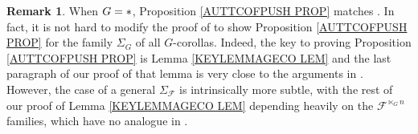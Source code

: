 \documentclass[a4paper,10pt
,draft
]{article}%
\numberwithin{equation}{section}
\numberwithin{figure}{section}
\theoremstyle{definition} %
\newtheorem{remark}[equation]{Remark}%
\newcommand{\1}{\ensuremath{\mathbbm 1}}%
\begin{document}
\begin{remark}\label{WRONGSTRAT REM}
When $G=\**$, Proposition \ref{AUTTCOFPUSH PROP}
matches \cite[Lemma 5.9]{BM08}.
In fact, it is not hard to modify the proof of \cite[Lemma 5.9]{BM08} to show Proposition \ref{AUTTCOFPUSH PROP} for the %
family $\Sigma_G$ of all $G$-corollas.
Indeed, the key to proving Proposition \ref{AUTTCOFPUSH PROP}
is Lemma \ref{KEYLEMMAGECO LEM} and
the last paragraph of our proof of that lemma
is very close to the arguments in 
\cite{BM08}.
However, the case of a general $\Sigma_{\mathcal{F}}$
is intrinsically more subtle,
with the rest of our proof of 
Lemma \ref{KEYLEMMAGECO LEM} 
depending heavily on the 
$\mathcal{F}^{\ltimes_G n}$ families,
which have no analogue in \cite{BM08}.
%
%
%
%
%
%
%

\end{remark}
\end{document}
